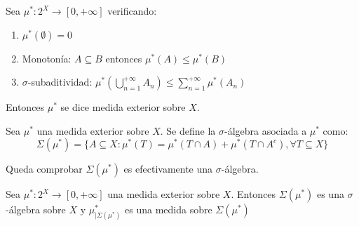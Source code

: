 \begin{definition}
 Sea $\mu^\ast : 2^X \rightarrow [0, +\infty]$ verificando:
 
 \begin{enumerate}[i]
  \item $\mu^\ast(\emptyset) = 0$
  \item Monotonía: $A\subseteq B$ entonces $\mu^\ast(A) \le \mu^\ast(B)$
  \item $\sigma$-subaditividad: $\mu^\ast \left(\bigcup_{n=1}^{+\infty} A_n \right) \le \sum_{n=1}^{+\infty} \mu^\ast (A_n)$
 \end{enumerate}
 
 Entonces $\mu^\ast$ se dice medida exterior sobre $X$.
\end{definition}

\begin{definition}
 Sea $\mu^\ast$ una medida exterior sobre $X$. Se define la $\sigma$-álgebra asociada a $\mu^\ast$ como:
 \[
   \Sigma(\mu^\ast) = \{A\subseteq X: \mu^\ast(T) = \mu^\ast(T\cap A) + \mu^\ast(T\cap A^c), \forall T\subseteq X\}
 \]
\end{definition}

Queda comprobar $\Sigma(\mu^\ast)$ es efectivamente una $\sigma$-álgebra.

\begin{theorem}
 Sea $\mu^\ast : 2^X \rightarrow [0, +\infty]$ una medida exterior sobre $X$. Entonces $\Sigma(\mu^\ast)$
 es una $\sigma$-álgebra sobre $X$ y $\mu^\ast_{|\Sigma(\mu^\ast)}$ es una medida sobre $\Sigma(\mu^\ast)$
 \label{th:outer-to-measure}
\end{theorem}

